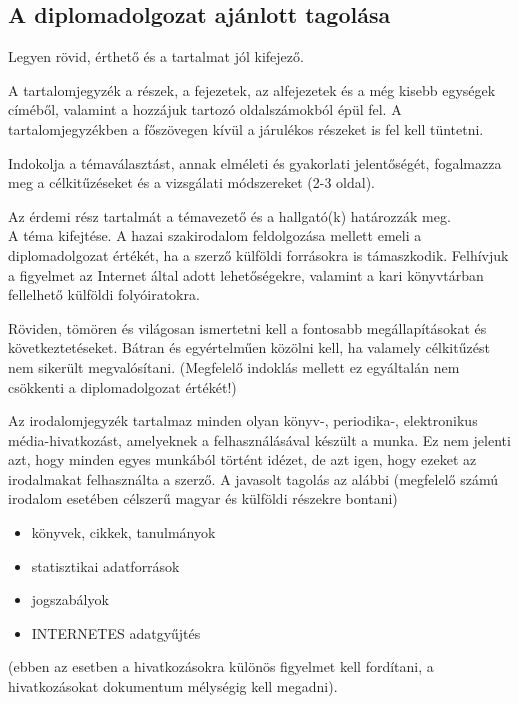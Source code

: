 \documentclass[magyar,12pt,oneside]{article}
\begin{document}
\subsection[Tagolás]{A diplomadolgozat ajánlott tagolása}
\begin{description}[style=nextline]
\item[A cím]
Legyen rövid, érthető és a tartalmat jól kifejező.
\item[Tartalomjegyzék]
A tartalomjegyzék a részek, a fejezetek, az alfejezetek és a még kisebb egységek címéből, valamint a hozzájuk tartozó oldalszámokból épül fel. A tartalomjegyzékben a főszövegen kívül a járulékos részeket is fel kell tüntetni.
\item[Bevezetés]
Indokolja a témaválasztást, annak elméleti és gyakorlati jelentőségét, fogalmazza meg a célkitűzéseket és a vizsgálati módszereket (2-3 oldal).
\item[Tárgyalási rész (30-40 oldal)]
Az érdemi rész tartalmát a témavezető és a hallgató(k) határozzák meg.\\
A téma kifejtése. A hazai szakirodalom feldolgozása mellett emeli a diplomadolgozat értékét, ha a szerző külföldi forrásokra is támaszkodik. Felhívjuk a figyelmet az Internet által adott lehetőségekre, valamint a kari könyvtárban fellelhető külföldi folyóiratokra.
\item[Összefoglalás (2-3 oldal)]
Röviden, tömören és világosan ismertetni kell a fontosabb megállapításokat és következtetéseket. Bátran és egyértelműen közölni kell, ha valamely célkitűzést nem sikerült megvalósítani. (Megfelelő indoklás mellett ez egyáltalán nem csökkenti a diplomadolgozat értékét!)
\item[Irodalomjegyzék]
Az irodalomjegyzék tartalmaz minden olyan könyv-, periodika-, elektronikus média-hivatkozást, amelyeknek a felhasználásával készült a munka. Ez nem jelenti azt, hogy minden egyes munkából történt idézet, de azt igen, hogy ezeket az irodalmakat felhasználta a szerző.\linebreak
A javasolt tagolás az alábbi (megfelelő számú irodalom esetében célszerű magyar és külföldi részekre bontani)
\begin{itemize}
\item könyvek, cikkek, tanulmányok
\item statisztikai adatforrások
\item jogszabályok
\item INTERNETES adatgyűjtés
\end{itemize}
(ebben az esetben a hivatkozásokra különös figyelmet kell fordítani, a hivatkozásokat dokumentum mélységig kell megadni).

\end{description}
\end{document}

